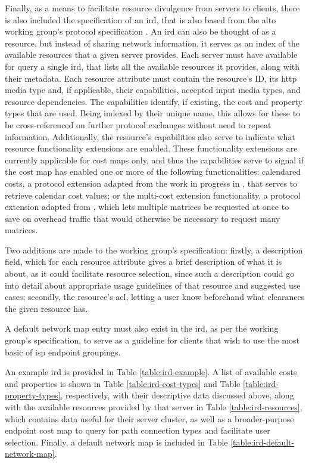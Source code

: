     Finally, as a means to facilitate resource divulgence from servers to clients, there is also included the specification of an \gls{ird}, that is also based from the \gls{alto} working group's protocol specification \cite{alto-protocol}.
    An \gls{ird} can also be thought of as a resource, but instead of sharing network information, it serves as an index of the available resources that a given server provides.
    Each server must have available for query a single \gls{ird}, that lists all the available resources it provides, along with their metadata.
    Each resource attribute must contain the resource's ID, its \gls{http} media type and, if applicable, their capabilities, accepted input media types, and resource dependencies.
    The capabilities identify, if existing, the cost and property types that are used.
    Being indexed by their unique name, this allows for these to be cross-referenced on further protocol exchanges without need to repeat information.
    Additionally, the resource's capabilities also serve to indicate what resource functionality extensions are enabled.
    These functionality extensions are currently applicable for cost maps only, and thus the capabilities serve to signal if the cost map has enabled one or more of the following functionalities: calendared costs, a protocol extension adapted from the work in progress in \cite{alto-calendar-cost-map}, that serves to retrieve calendar cost values; or the multi-cost extension functionality, a protocol extension adapted from \cite{alto-multi-cost}, which lets multiple matrices be requested at once to save on overhead traffic that would otherwise be necessary to request many matrices.

    Two additions are made to the working group's specification: firstly, a description field, which for each resource attribute gives a brief description of what it is about, as it could facilitate resource selection, since such a description could go into detail about appropriate usage guidelines of that resource and suggested use cases; secondly, the resource's \gls{acl}, letting a user know beforehand what clearances the given resource has. 

    A default network map entry must also exist in the \gls{ird}, as per the working group's specification, to serve as a guideline for clients that wish to use the most basic of \gls{isp} endpoint groupings.

    An example \gls{ird} is provided in Table \ref{table:ird-example}.
    A list of available costs and properties is shown in Table \ref{table:ird-cost-types} and Table \ref{table:ird-property-types}, respectively, with their descriptive data discussed above, along with the available resources provided by that server in Table \ref{table:ird-resources}, which contains data useful for their server cluster, as well as a broader-purpose endpoint cost map to query for path connection types and facilitate user selection.
    Finally, a default network map is included in Table \ref{table:ird-default-network-map}.

